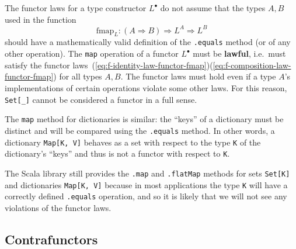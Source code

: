 The functor laws for a type constructor $L^{\bullet}$ do not assume
that the types $A,B$ used in the function
\[
\text{fmap}_{L}:\left(A\Rightarrow B\right)\Rightarrow L^{A}\Rightarrow L^{B}
\]
should have a mathematically valid definition of the \lstinline!.equals!
method (or of any other operation). The \lstinline!map! operation
of a functor $L^{\bullet}$ must be \textbf{lawful},
i.e.~must satisfy the functor laws~(\ref{eq:f-identity-law-functor-fmap})\textendash (\ref{eq:f-composition-law-functor-fmap})
for all types $A,B$. The functor laws must hold even if a type $A$'s
implementations of certain operations violate some other laws. For
this reason, \lstinline!Set[_]! cannot be considered a functor in
a full sense.

The \lstinline!map! method for dictionaries is similar: the ``keys''
of a dictionary must be distinct and will be compared using the \lstinline!.equals!
method. In other words, a dictionary \lstinline!Map[K, V]! behaves
as a set with respect to the type \lstinline!K! of the dictionary's
``keys'' and thus is not a functor with respect to \lstinline!K!.

The Scala library still provides the \lstinline!.map! and \lstinline!.flatMap!
methods for sets \lstinline!Set[K]! and dictionaries \lstinline!Map[K, V]!
because in most applications the type \lstinline!K! will have a correctly
defined \lstinline!.equals! operation, and so it is likely that we
will not see any violations of the functor laws.

\subsection{Contrafunctors}

